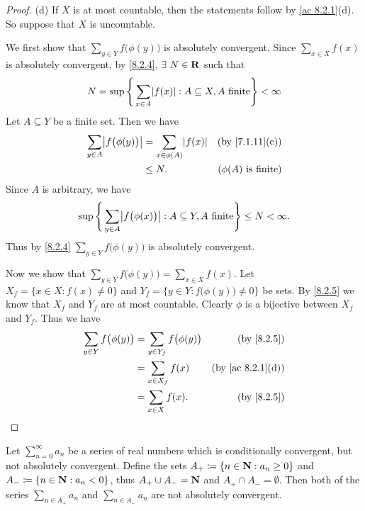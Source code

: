 \begin{proof}{(d)}
  If \(X\) is at most countable, then the statements follow by \cref{ac 8.2.1}(d).
  So suppose that \(X\) is uncountable.

  We first show that \(\sum_{y \in Y} f\big(\phi(y)\big)\) is absolutely convergent.
  Since \(\sum_{x \in X} f(x)\) is absolutely convergent, by \cref{8.2.4}, \(\exists\ N \in \R\) such that
  \[
    N = \sup\Bigg\{\sum_{x \in A} \abs{f(x)} : A \subseteq X, A \text{ finite}\Bigg\} < \infty
  \]
  Let \(A \subseteq Y\) be a finite set.
  Then we have
  \begin{align*}
    \sum_{y \in A} \abs{f\big(\phi(y)\big)} & = \sum_{x \in \phi(A)} \abs{f(x)} & \text{(by \cref{7.1.11}(c))}   \\
                                            & \leq N.                           & \text{(\(\phi(A)\) is finite)}
  \end{align*}
  Since \(A\) is arbitrary, we have
  \[
    \sup\Bigg\{\sum_{y \in A} \abs{f\big(\phi(x)\big)} : A \subseteq Y, A \text{ finite}\Bigg\} \leq N < \infty.
  \]
  Thus by \cref{8.2.4} \(\sum_{y \in Y} f\big(\phi(y)\big)\) is absolutely convergent.

  Now we show that \(\sum_{y \in Y} f\big(\phi(y)\big) = \sum_{x \in X} f(x)\).
  Let \(X_f = \{x \in X : f(x) \neq 0\}\) and \(Y_f = \{y \in Y : f\big(\phi(y)\big) \neq 0\}\) be sets.
  By \cref{8.2.5} we know that \(X_f\) and \(Y_f\) are at most countable.
  Clearly \(\phi\) is a bijective between \(X_f\) and \(Y_f\).
  Thus we have
  \begin{align*}
    \sum_{y \in Y} f\big(\phi(y)\big) & = \sum_{y \in Y_f} f\big(\phi(y)\big) & \text{(by \cref{8.2.5})}       \\
                                      & = \sum_{x \in X_f} f(x)               & \text{(by \cref{ac 8.2.1}(d))} \\
                                      & = \sum_{x \in X} f(x).                & \text{(by \cref{8.2.5})}
  \end{align*}
\end{proof}

\begin{lemma}\label{8.2.7}
  Let \(\sum_{n = 0}^\infty a_n\) be a series of real numbers which is conditionally convergent, but not absolutely convergent.
  Define the sets \(A_+ \coloneqq \{n \in \mathbf{N} : a_n \geq 0\}\) and \(A_- \coloneqq \{n \in \mathbf{N} : a_n < 0\}\), thus \(A_+ \cup A_- = \mathbf{N}\) and \(A_+ \cap A_- = \emptyset\).
  Then both of the series \(\sum_{n \in A_+} a_n\) and \(\sum_{n \in A_-} a_n\) are not absolutely convergent.
\end{lemma}

